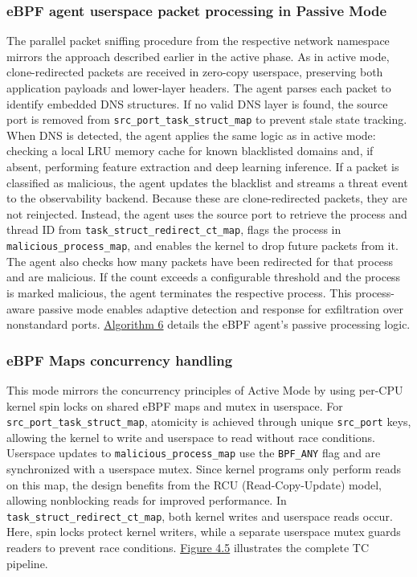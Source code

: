 \documentclass [11pt, proquest] {uwthesis}[2020/02/24]
\begin{document}
\subsubsection{\textbf{eBPF agent userspace packet processing in Passive Mode}}
\label{passive:sec2}
The parallel packet sniffing procedure from the respective network namespace mirrors the approach described earlier in the active phase. As in active mode, clone-redirected packets are received in zero-copy userspace, preserving both application payloads and lower-layer headers. The agent parses each packet to identify embedded DNS structures. If no valid DNS layer is found, the source port is removed from \texttt{src\_port\_task\_struct\_map} to prevent stale state tracking. When DNS is detected, the agent applies the same logic as in active mode: checking a local LRU memory cache for known blacklisted domains and, if absent, performing feature extraction and deep learning inference.
If a packet is classified as malicious, the agent updates the blacklist and streams a threat event to the observability backend. Because these are clone-redirected packets, they are not reinjected. Instead, the agent uses the source port to retrieve the process and thread ID from \texttt{task\_struct\_redirect\_ct\_map}, flags the process in \texttt{malicious\_process\_map}, and enables the kernel to drop future packets from it. The agent also checks how many packets have been redirected for that process and are malicious. If the count exceeds a configurable threshold and the process is marked malicious, the agent terminates the respective process.
This process-aware passive mode enables adaptive detection and response for exfiltration over nonstandard ports. \hyperref[sec:alg6]{Algorithm 6} details the eBPF agent's passive processing logic.

\subsubsection{\textbf{eBPF Maps concurrency handling}}
\label{passive:sec3}
This mode mirrors the concurrency principles of Active Mode by using per-CPU kernel spin locks on shared eBPF maps and mutex in userspace. For \texttt{src\_port\_task\_struct\_map}, atomicity is achieved through unique \texttt{src\_port} keys, allowing the kernel to write and userspace to read without race conditions. Userspace updates to \texttt{malicious\_process\_map} use the \texttt{BPF\_ANY} flag and are synchronized with a userspace mutex. Since kernel programs only perform reads on this map, the design benefits from the RCU (Read-Copy-Update) model, allowing nonblocking reads for improved performance. In \texttt{task\_struct\_redirect\_ct\_map}, both kernel writes and userspace reads occur. Here, spin locks protect kernel writers, while a separate userspace mutex guards readers to prevent race conditions.
\hyperref[sec:dp-passive-phase]{Figure 4.5} illustrates the complete TC pipeline.
\end{document}
